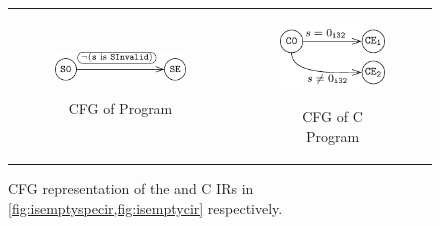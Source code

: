 \begin{figure}
\begin{tabular}{@{}c@{}c@{}}
\begin{subfigure}[b]{0.5\textwidth}
\begin{center}
{\includegraphics[scale=1.4]{chapters/figures/figIsEmptySpecCFG.pdf}}
\end{center}
\vspace{20px}
\caption{\label{fig:isemptyspeccfg}CFG of \SpecL{} Program}
\end{subfigure}%
&
\begin{subfigure}[b]{0.5\textwidth}
\begin{center}
{\includegraphics[scale=1.4]{chapters/figures/figIsEmptyCCFG.pdf}}
\end{center}
\caption{\label{fig:isemptyccfg}CFG of C Program}
\end{subfigure}%
\\
\end{tabular}
\caption{\label{fig:isemptyspecandccfg}CFG representation of the \SpecL{} and C IRs in \cref{fig:isemptyspecir,fig:isemptycir} respectively.}
\end{figure}
